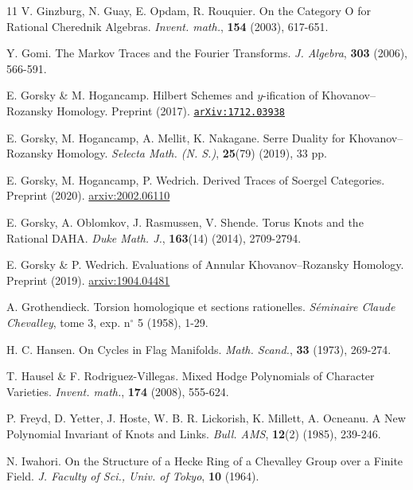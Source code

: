 \documentclass[a4paper,10pt,leqno]{amsart}
\theoremstyle{plain}
\theoremstyle{plain}
\theoremstyle{plain}
\theoremstyle{definition}
\theoremstyle{remark}
\begin{document}
\begin{thebibliography}{11}
	V. Ginzburg, N. Guay, E. Opdam, R. Rouquier.
	On the Category O for Rational Cherednik
Algebras.
	\textsl{Invent. math.},
	\textbf{154}
	(2003),
	617-651.

	Y. Gomi.
	The Markov Traces and the Fourier Transforms.
	\textsl{J. Algebra},
	\textbf{303}
	(2006),
	566-591.
	
	E. Gorsky \& M. Hogancamp.
	Hilbert Schemes and $y$-ification of Khovanov--Rozansky Homology.
	Preprint
	(2017).
	\href{arXiv:1712.03938}{\texttt{arXiv:1712.03938}}

	E. Gorsky, M. Hogancamp, A. Mellit, K. Nakagane.
	Serre Duality for Khovanov--Rozansky Homology.
	\textsl{Selecta Math. (N. S.)},
	\textbf{25}(79)
	(2019),
	33 pp.

	E. Gorsky, M. Hogancamp, P. Wedrich.
	Derived Traces of Soergel Categories.
	Preprint
	(2020).
	\href{arXiv:2002.06110}{\url{arxiv:2002.06110}}
	
	E. Gorsky, A. Oblomkov, J. Rasmussen, V. Shende.
	Torus Knots and the Rational DAHA.
	\textsl{Duke Math. J.},
	\textbf{163}(14)
	(2014),
	2709-2794.

	E. Gorsky \& P. Wedrich.
	Evaluations of Annular Khovanov--Rozansky Homology.
	Preprint
	(2019).
	\href{arXiv:1904.04481}{\url{arxiv:1904.04481}}
	
	A. Grothendieck.
	Torsion homologique et sections rationelles.
	\textsl{Séminaire Claude Chevalley},
	tome 3, exp. n${}^\circ$ 5
	(1958),
	1-29.

	H. C. Hansen.
	On Cycles in Flag Manifolds.
	\textsl{Math. Scand.},
	\textbf{33}
	(1973),
	269-274.
	

	T. Hausel \& F. Rodriguez-Villegas.
	Mixed Hodge Polynomials of Character Varieties.
	\textsl{Invent. math.},
	\textbf{174}
	(2008),
	555-624.

	P. Freyd, D. Yetter, J. Hoste, W. B. R. Lickorish, K. Millett, A. Ocneanu.
	A New Polynomial Invariant of Knots and Links.
	\textsl{Bull. AMS},
	\textbf{12}(2)
	(1985),
	239-246.

	N. Iwahori.
	On the Structure of a Hecke Ring of a Chevalley Group over a Finite Field.
	\textsl{J. Faculty of Sci., Univ. of Tokyo},
	\textbf{10}
	(1964).
	

\end{thebibliography}
\end{document}
